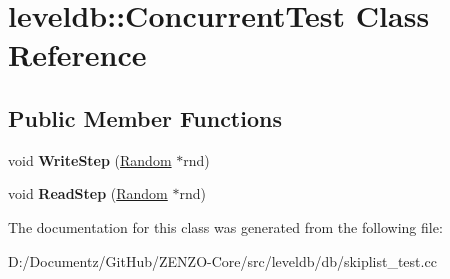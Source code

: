 \hypertarget{classleveldb_1_1_concurrent_test}{}\section{leveldb\+::Concurrent\+Test Class Reference}
\label{classleveldb_1_1_concurrent_test}
\subsection*{Public Member Functions}
\begin{DoxyCompactItemize}
\item 
\mbox{\label{classleveldb_1_1_concurrent_test_a43dc8afb9124c364d6e97dc3d421131f}} 
void {\bfseries Write\+Step} (\mbox{\hyperlink{classleveldb_1_1_random}{Random}} $\ast$rnd)
\item 
\mbox{\label{classleveldb_1_1_concurrent_test_a9dcaf11ec747ad37150526f891627c50}} 
void {\bfseries Read\+Step} (\mbox{\hyperlink{classleveldb_1_1_random}{Random}} $\ast$rnd)
\end{DoxyCompactItemize}


The documentation for this class was generated from the following file\+:\begin{DoxyCompactItemize}
\item 
D\+:/\+Documentz/\+Git\+Hub/\+Z\+E\+N\+Z\+O-\/\+Core/src/leveldb/db/skiplist\+\_\+test.\+cc\end{DoxyCompactItemize}
